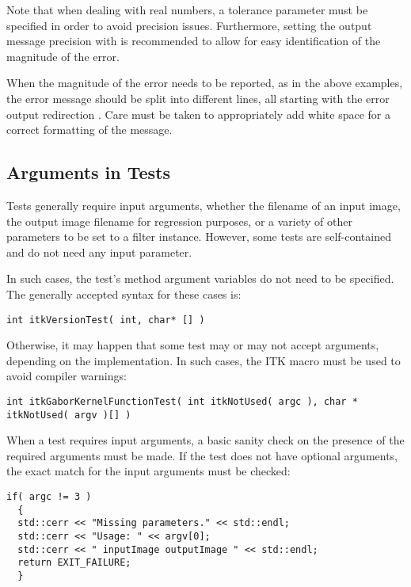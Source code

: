 Note that when dealing with real numbers, a tolerance parameter must be
specified in order to avoid precision issues. Furthermore, setting the output
message precision with  is recommended to
allow for easy identification of the magnitude of the error.

When the magnitude of the error needs to be reported, as in the above examples,
the error message should be split into different lines, all starting with the
error output redirection . Care must be taken to
appropriately add white space for a correct formatting of the message.


\subsection{Arguments in Tests}
\label{subsec:ArgumentsInTests}

Tests generally require input arguments, whether the filename of an input image,
the output image filename for regression purposes, or a variety of other
parameters to be set to a filter instance. However, some tests are
self-contained and do not need any input parameter.

In such cases, the test's  method argument variables do not need to
be specified. The generally accepted syntax for these cases is:

\small
\begin{verbatim}
int itkVersionTest( int, char* [] )
\end{verbatim}
\normalsize

Otherwise, it may happen that some test may or may not accept arguments,
depending on the implementation. In such cases, the  ITK macro
must be used to avoid compiler warnings:

\small
\begin{verbatim}
int itkGaborKernelFunctionTest( int itkNotUsed( argc ), char * itkNotUsed( argv )[] )
\end{verbatim}
\normalsize

When a test requires input arguments, a basic sanity check on the presence of
the required arguments must be made. If the test does not have optional
arguments, the exact match for the input arguments must be checked:

\small
\begin{verbatim}
if( argc != 3 )
  {
  std::cerr << "Missing parameters." << std::endl;
  std::cerr << "Usage: " << argv[0];
  std::cerr << " inputImage outputImage " << std::endl;
  return EXIT_FAILURE;
  }
\end{verbatim}
\normalsize


